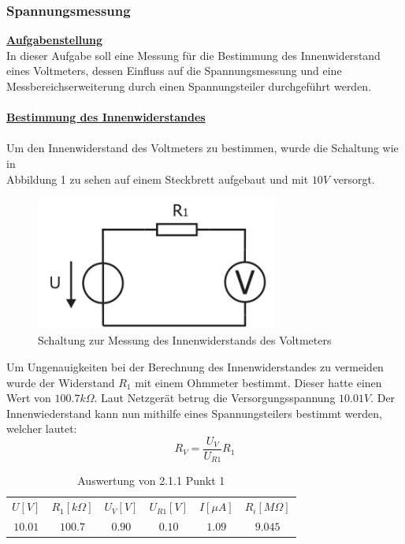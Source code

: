 \documentclass[a4paper,12pt]{article}
\begin{document}
	\subsubsection{Spannungsmessung}
	\underline{\textbf{Aufgabenstellung}} \\ \newline
	\noindent
	In dieser Aufgabe soll eine Messung für die Bestimmung des Innenwiderstand eines Voltmeters, dessen Einfluss auf die Spannungsmessung und eine Messbereichserweiterung durch einen Spannungsteiler durchgeführt werden. \\ \\
	\noindent
	\underline{\textbf{Bestimmung des Innenwiderstandes}} \\ \\
	Um den Innenwiderstand des Voltmeters zu bestimmen, wurde die Schaltung wie in \\
	Abbildung 1 zu sehen auf einem Steckbrett aufgebaut und mit \(10V\) versorgt.
	\begin{figure}[h]
		\centering
		\includegraphics[width=8cm]{img/Voltmeter_Innenwiderstand}
		\caption{Schaltung zur Messung des Innenwiderstands des Voltmeters}
	\end{figure}
	\newline
	Um Ungenauigkeiten bei der Berechnung des Innenwiderstandes zu vermeiden wurde der Widerstand \(R_1\) mit einem Ohmmeter bestimmt. Dieser hatte einen Wert von \(100.7k\Omega\). Laut Netzgerät betrug die Versorgungsspannung \(10.01V\). Der Innenwiederstand kann nun mithilfe eines Spannungsteilers bestimmt werden, welcher lautet:
	\[
		R_V = \frac{U_V}{U_{R1}}R_1
	\]
	\newpage
	\begin{table}[h]
		\centering
		\begin{tabular}{|c|c|c|c|c|c|}
			\hline
			\multirow{2}{*}{$U[V]$} & \multirow{2}{*}{$R_1[k\Omega]$} & \multirow{2}{*}{$U_V[V]$} & \multirow{2}{*}{$U_{R1}[V]$} & \multirow{2}{*}{$I[\mu A]$} & \multirow{2}{*}{$R_i[M\Omega]$} \\
			&  &  &  &  &  \\ \hline
			\multirow{2}{*}{$10.01$} & \multirow{2}{*}{$100.7$} & \multirow{2}{*}{$0.90$} & \multirow{2}{*}{$0.10$} & \multirow{2}{*}{$1.09$} & \multirow{2}{*}{$9.045$} \\
			&  &  &  &  &  \\ \hline
		\end{tabular}
		\caption{Auswertung von 2.1.1 Punkt 1}
	\end{table}
\end{document}

